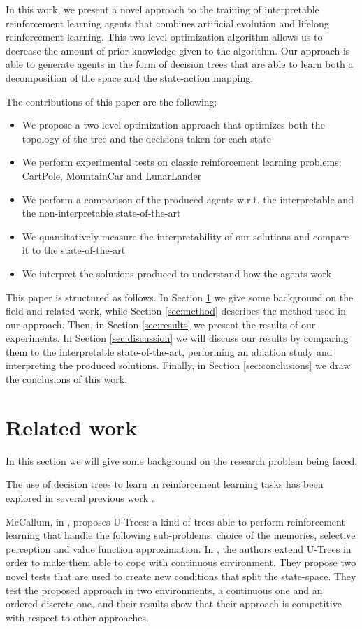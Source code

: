 \documentclass[review,english]{elsarticle}
\begin{document}
In this work, we present a novel approach to the training of interpretable reinforcement learning agents that combines artificial evolution and lifelong reinforcement-learning.
This two-level optimization algorithm allows us to decrease the amount of prior knowledge given to the algorithm.
Our approach is able to generate agents in the form of decision trees that are able to learn both a decomposition of the space and the state-action mapping.

The contributions of this paper are the following:
\begin{itemize}
    \item We propose a two-level optimization approach that optimizes both the topology of the tree and the decisions taken for each state
    \item We perform experimental tests on classic reinforcement learning problems: CartPole, MountainCar and LunarLander
    \item We perform a comparison of the produced agents w.r.t. the interpretable and the non-interpretable state-of-the-art
    \item We quantitatively measure the interpretability of our solutions and compare it to the state-of-the-art
    \item We interpret the solutions produced to understand how the agents work
\end{itemize}

This paper is structured as follows.
In Section \ref{ref:theory} we give some background on the field and related work, while Section \ref{sec:method} describes the method used in our approach.
Then, in Section \ref{sec:results} we present the results of our experiments. In Section \ref{sec:discussion} we will discuss our results by comparing them to the interpretable state-of-the-art, performing an ablation study and interpreting the produced solutions. Finally, in Section \ref{sec:conclusions} we draw the conclusions of this work.

\section{Related work}
\label{ref:theory}
In this section we will give some background on the research problem being faced.

The use of decision trees to learn in reinforcement learning tasks has been explored in several previous work . 

McCallum, in \cite{mccallum_1996_reinforcement}, proposes U-Trees: a kind of trees able to perform reinforcement learning that handle the following sub-problems: choice of the memories, selective perception and value function approximation.
In \cite{uther1998tree}, the authors extend U-Trees in order to make them able to cope with continuous environment. They propose two novel tests that are used to create new conditions that split the state-space. They test the proposed approach in two environments, a continuous one and an ordered-discrete one, and their results show that their approach is competitive with respect to other approaches.
\end{document}
